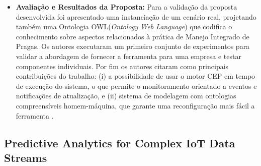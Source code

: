 \documentclass[tid,table]{texufpel} %
\begin{document}
\begin{itemize}
	
	\item \textbf{Avaliação e Resultados da Proposta:} Para a validação da proposta desenvolvida foi apresentado uma instanciação de um cenário real, projetando também uma Ontologia OWL(\textit{Ontology Web Language}) que codifica o conhecimento sobre aspectos relacionados à prática de Manejo Integrado de Pragas. Os autores executaram um primeiro conjunto de experimentos para validar a abordagem de fornecer a ferramenta para uma empresa e testar componentes individuais. Por fim os autores citaram como principais contribuições do trabalho: (i) a possibilidade de usar o motor CEP em tempo de execução do sistema, o que permite o monitoramento orientado a eventos e notificações de atualização, e (ii) sistema de modelagem com ontologias compreensíveis homem-máquina, que garante uma reconfiguração mais fácil a ferramenta \cite{art3nocera2017semantic}. 
	
\end{itemize}

\subsection{Predictive Analytics for Complex IoT Data Streams}
\end{document}
